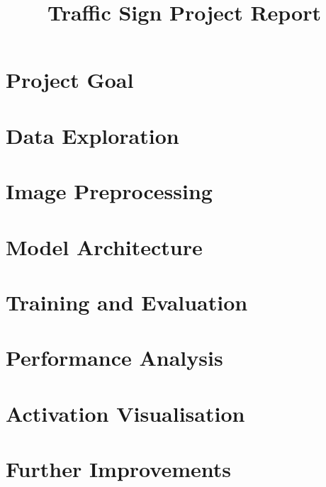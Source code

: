 \documentclass[]{article}
\title{Traffic Sign Project Report}
\begin{document}
\maketitle

\section{Project Goal}

\section{Data Exploration}

\section{Image Preprocessing}

\section{Model Architecture}

\section{Training and Evaluation}

\section{Performance Analysis}

\section{Activation Visualisation}

\section{Further Improvements}
\end{document}
